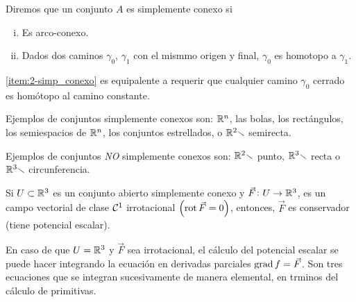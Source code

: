 \begin{defi}
    Diremos que un conjunto $A$ es simplemente conexo si
    \begin{enumerate}[i)]
        \item Es arco-conexo.
        \item\label{item:2-simp_conexo} Dados dos caminos $\gamma_0$, $\gamma_1$ con el mismmo origen y final,
            $\gamma_0$ es homotopo a $\gamma_1$.
    \end{enumerate}
\end{defi}

\begin{obs*}
    \ref{item:2-simp_conexo} es equipalente a requerir que cualquier camino $\gamma_0$ cerrado es homótopo al camino
    constante.
\end{obs*}

\begin{obs}
    Ejemplos de conjuntos simplemente conexos son: $\mathbb{R}^n$, las bolas, los rectángulos, los semiespacios de $\mathbb{R}^n$,
    los conjuntos estrellados, o $\mathbb{R}^2 \smallsetminus$ semirecta.

    Ejemplos de conjuntos \emph{NO} simplemente conexos son: $\mathbb{R}^2 \smallsetminus$ punto, $\mathbb{R}^3 \smallsetminus$ recta o
    $\mathbb{R}^3 \smallsetminus$ circunferencia.
\end{obs}

\begin{prop}
    Si $U \subset \mathbb{R}^3$ es un conjunto abierto simplemente conexo y $\vec{F} \colon U \to \mathbb{R}^3$, es un campo vectorial
    de clase $\mathcal{C}^1$ irrotacional $\left( \operatorname{rot} \vec{F} = 0 \right)$, entonces, $\vec{F}$ es conservador (tiene potencial
    escalar).
\end{prop}

\begin{obs}
    En caso de que $U = \mathbb{R}^3$ y $\vec{F}$ sea irrotacional, el cálculo del potencial escalar se puede hacer integrando
    la ecuación en derivadas parciales $\operatorname{grad} f = \vec{F}$. Son tres ecuaciones que se integran sucesivamente de manera
    elemental, en trminos del cálculo de primitivas.
\end{obs}

